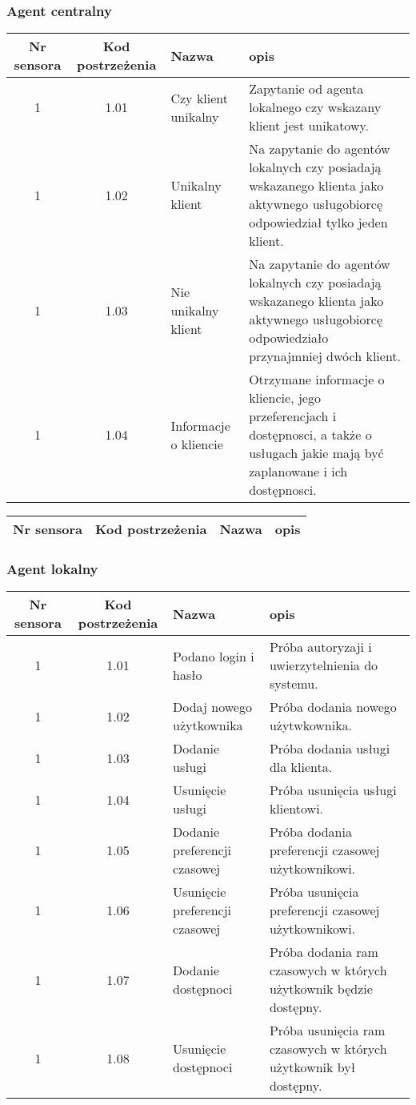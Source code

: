 \subsubsection{Agent centralny}

\begin{tabular}{c|c|p{3cm}|p{5cm}}
Nr sensora & Kod postrzeżenia & Nazwa & opis\\
\hline
1 & 1.01 & Czy klient unikalny & Zapytanie od agenta lokalnego czy wskazany klient jest unikatowy.\\
1 & 1.02 & Unikalny klient & Na zapytanie do agentów lokalnych czy posiadają wskazanego klienta jako aktywnego usługobiorcę odpowiedział tylko jeden klient.\\
1 & 1.03 & Nie unikalny klient & Na zapytanie do agentów lokalnych czy posiadają wskazanego klienta jako aktywnego usługobiorcę odpowiedziało przynajmniej dwóch klient.\\
1 & 1.04 & Informacje o kliencie & Otrzymane informacje o kliencie, jego przeferencjach i dostępnosci, a także o usługach jakie mają być zaplanowane i ich dostępnosci.\\
\end{tabular}

\begin{tabular}{c|c|p{3cm}|p{5cm}}
Nr sensora & Kod postrzeżenia & Nazwa & opis\\
\hline

\end{tabular}


\subsubsection{Agent lokalny}

\begin{tabular}{c|c|p{3cm}|p{5cm}}
Nr sensora & Kod postrzeżenia & Nazwa & opis\\
\hline
1 & 1.01 & Podano login i hasło & Próba autoryzaji i uwierzytelnienia do systemu.\\
1 & 1.02 & Dodaj nowego użytkownika & Próba dodania nowego użytwkownika.\\
1 & 1.03 & Dodanie usługi & Próba dodania usługi dla klienta.\\
1 & 1.04 & Usunięcie usługi & Próba usunięcia usługi klientowi.\\
1 & 1.05 & Dodanie preferencji czasowej & Próba dodania preferencji czasowej użytkownikowi.\\
1 & 1.06 & Usunięcie preferencji czasowej & Próba usunięcia preferencji czasowej użytkownikowi.\\
1 & 1.07 & Dodanie dostępnoci & Próba dodania ram czasowych w których użytkownik będzie dostępny.\\
1 & 1.08 & Usunięcie dostępnoci & Próba usunięcia ram czasowych w których użytkownik był dostępny.\\
\end{tabular}

